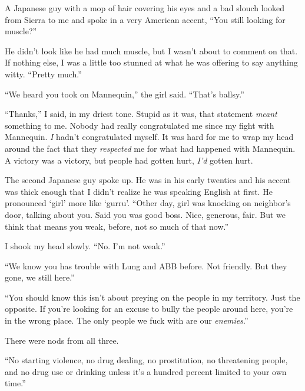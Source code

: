 A Japanese guy with a mop of hair covering his eyes and a bad slouch looked from Sierra to me and spoke in a very American accent, ``You still looking for muscle?''



He didn't look like he had much muscle, but I wasn't about to comment on that.  If nothing else, I was a little too stunned at what he was offering to say anything witty.  ``Pretty much.''



``We heard you took on Mannequin,'' the girl said.  ``That's ballsy.''



``Thanks,'' I said, in my driest tone.  Stupid as it was, that statement \emph{meant} something to me.  Nobody had really congratulated me since my fight with Mannequin.  \emph{I} hadn't congratulated myself.  It was hard for me to wrap my head around the fact that they \emph{respected} me for what had happened with Mannequin.  A victory was a victory, but people had gotten hurt, \emph{I'd} gotten hurt.



The second Japanese guy spoke up.  He was in his early twenties and his accent was thick enough that I didn't realize he was speaking English at first.  He pronounced `girl' more like `gurru'. ``Other day, girl was knocking on neighbor's door, talking about you.  Said you was good boss.  Nice, generous, fair.  But we think that means you weak, before, not so much of that now.''



I shook my head slowly.  ``No.  I'm not weak.''



``We know you has trouble with Lung and ABB before.  Not friendly.  But they gone, we still here.''



``You should know this isn't about preying on the people in my territory.  Just the opposite.  If you're looking for an excuse to bully the people around here, you're in the wrong place.  The only people we fuck with are our \emph{enemies}.''



There were nods from all three.



``No starting violence, no drug dealing, no prostitution, no threatening people, and no drug use or drinking unless it's a hundred percent limited to your own time.''



